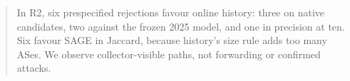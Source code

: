 \begin{abstract}
In R2, six prespecified rejections favour online history: three on native candidates, two against the frozen 2025 model, and one in precision at ten.
Six favour SAGE in Jaccard, because history's size rule adds too many ASes.
We observe collector-visible paths, not forwarding or confirmed attacks.
\end{abstract}
